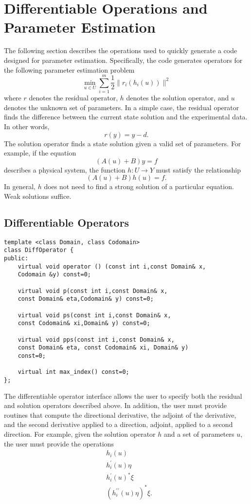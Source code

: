 \documentclass{article}
\begin{document}
\section{Differentiable Operations and Parameter Estimation}

	The following section describes the operations used to quickly generate a code designed for parameter estimation.  Specifically, the code generates operators for the following parameter estimation problem
$$
	\min\limits_{u\in U} \sum\limits_{i=1}^m\frac{1}{2}\|r_i(h_i(u))\|^2
$$
where $r$ denotes the residual operator, $h$ denotes the solution operator, and $u$ denotes the unknown set of parameters.  In a simple case, the residual operator finds the difference between the current state solution and the experimental data.  In other words,
$$
	r(y)=y-d.
$$
The solution operator finds a state solution given a valid set of parameters.  For example, if the equation
$$
(A(u)+B)y=f
$$
describes a physical system, the function $h:U\rightarrow Y$ must satisfy the relationship
$$
(A(u)+B)h(u)=f.
$$
In general, $h$ does not need to find a strong solution of a particular equation.  Weak solutions suffice.

\subsection{Differentiable Operators}

\begin{flushleft}
\begin{lstlisting}
template <class Domain, class Codomain>
class DiffOperator {
public:
    virtual void operator () (const int i,const Domain& x,
	Codomain &y) const=0;

    virtual void p(const int i,const Domain& x,
	const Domain& eta,Codomain& y) const=0;

    virtual void ps(const int i,const Domain& x,
	const Codomain& xi,Domain& y) const=0;

    virtual void pps(const int i,const Domain& x,
	const Domain& eta, const Codomain& xi, Domain& y)
	const=0;

    virtual int max_index() const=0;
};
\end{lstlisting}
\end{flushleft}

The differentiable operator interface allows the user to specify both the residual and solution operators described above.  In addition, the user must provide routines that compute the directional derivative, the adjoint of the derivative, and the second derivative applied to a direction, adjoint, applied to a second direction.  For example, given the solution operator $h$ and a set of parameters $u$, the user must provide the operations
\begin{align*}
    &h_i(u)\\
    &h_i^\prime(u)\eta\\
    &h_i^\prime(u)^*\xi\\
    &(h_i^{\prime\prime}(u)\eta)^*\xi.
\end{align*}
\end{document}
